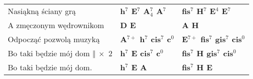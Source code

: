 {\begin{tabular}{@{}p{60mm}@{}p{30mm}|l}
Nasiąkną ściany grą  & {\bfseries h$^7$ E$^7$ A$^{7}_{4}$ A$^7$ }  & {\bfseries fis$^7$ H$^7$ E$^4$ E$^7$} \\
A zmęczonym wędrownikom & {\bfseries D E }  & {\bfseries A H } \\
Odpocząć pozwolą muzyką & {\bfseries A$^{7+}$ h$^7$ cis$^7$ c$^0$ }  & {\bfseries E$^{7+}$ fis$^7$ gis$^7$ cis$^0$}\\
Bo taki będzie mój dom $\Vert\ \times$ 2 & {\bfseries h$^7$ E cis$^7$ c$^0$ } & {\bfseries fis$^7$ H gis$^7$ cis$^0$}\\
Bo taki będzie mój dom. & {\bfseries h$^7$ E A } & {\bfseries fis$^7$ H E} \\
\end{tabular}
}\\
 \hspace{1em}
 \hspace{1em}
\newpage
